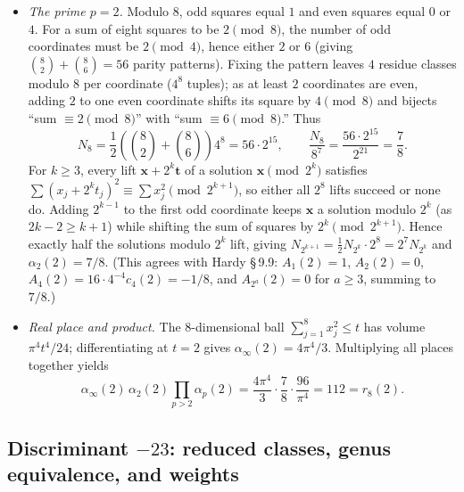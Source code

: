 \begin{itemize}
\item \emph{The prime $p=2$.} Modulo $8$, odd squares equal $1$ and even squares equal $0$ or $4$. For a sum of eight squares to be $2\pmod 8$, the number of odd coordinates must be $2\pmod 4$, hence either $2$ or $6$ (giving $\binom{8}{2}+\binom{8}{6}=56$ parity patterns). Fixing the pattern leaves $4$ residue classes modulo $8$ per coordinate ($4^8$ tuples); as at least $2$ coordinates are even, adding $2$ to one even coordinate shifts its square by $4\pmod 8$ and bijects ``sum $\equiv 2\pmod 8$'' with ``sum $\equiv 6\pmod 8$.'' Thus
\[
N_8=\frac{1}{2}\left(\binom{8}{2}+\binom{8}{6}\right)4^8=56\cdot 2^{15}, \qquad \frac{N_8}{8^7}=\frac{56\cdot 2^{15}}{2^{21}}=\frac{7}{8}.
\]
For $k\ge 3$, every lift $\mathbf x+2^k\mathbf t$ of a solution $\mathbf x\pmod{2^k}$ satisfies $\sum(x_j+2^k t_j)^2\equiv\sum x_j^2\pmod{2^{k+1}}$, so either all $2^8$ lifts succeed or none do. Adding $2^{k-1}$ to the first odd coordinate keeps $\mathbf x$ a solution modulo $2^k$ (as $2k-2\ge k+1$) while shifting the sum of squares by $2^k\pmod{2^{k+1}}$. Hence exactly half the solutions modulo $2^k$ lift, giving $N_{2^{k+1}}=\tfrac{1}{2}N_{2^k}\cdot 2^8=2^7 N_{2^k}$ and $\alpha_2(2)=7/8$. (This agrees with Hardy \S\,9.9: $A_1(2)=1$, $A_2(2)=0$, $A_4(2)=16\cdot 4^{-4}c_4(2)=-1/8$, and $A_{2^a}(2)=0$ for $a\ge 3$, summing to $7/8$.)

\item \emph{Real place and product.} The $8$-dimensional ball $\sum_{j=1}^{8}x_j^2\le t$ has volume $\pi^4 t^4/24$; differentiating at $t=2$ gives $\alpha_\infty(2)=4\pi^4/3$. Multiplying all places together yields
\[
\alpha_\infty(2)\,\alpha_2(2)\prod_{p>2}\alpha_p(2)=\frac{4\pi^4}{3}\cdot\frac{7}{8}\cdot\frac{96}{\pi^4}=112=r_8(2).
\]
\end{itemize}

\subsection{Discriminant \texorpdfstring{$-23$}{-23}: reduced classes, genus equivalence, and weights}

